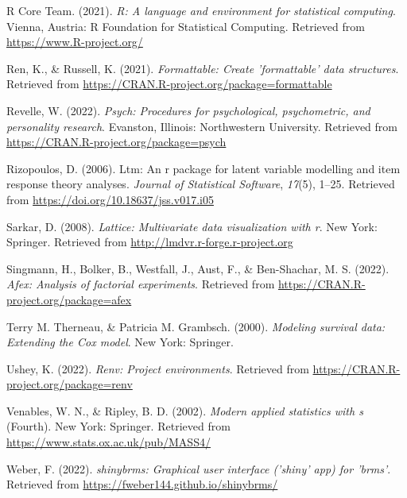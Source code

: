 \documentclass[
  english,
  man]{apa6}
\newlength{\cslhangindent}
\newlength{\cslentryspacingunit} %
\newenvironment{CSLReferences}[2] %
 {%
  \setlength{\parindent}{0pt}
  \ifodd #1
  \let\oldpar\par
  \def\par{\hangindent=\cslhangindent\oldpar}
  \fi
  \setlength{\parskip}{#2\cslentryspacingunit}
 }%
 {}
\begin{document}
\begin{CSLReferences}{1}{0}
\leavevmode{}%
R Core Team. (2021). \emph{R: A language and environment for statistical computing}. Vienna, Austria: R Foundation for Statistical Computing. Retrieved from \url{https://www.R-project.org/}

\leavevmode{}%
Ren, K., \& Russell, K. (2021). \emph{Formattable: Create 'formattable' data structures}. Retrieved from \url{https://CRAN.R-project.org/package=formattable}

\leavevmode{}%
Revelle, W. (2022). \emph{Psych: Procedures for psychological, psychometric, and personality research}. Evanston, Illinois: Northwestern University. Retrieved from \url{https://CRAN.R-project.org/package=psych}

\leavevmode{}%
Rizopoulos, D. (2006). Ltm: An r package for latent variable modelling and item response theory analyses. \emph{Journal of Statistical Software}, \emph{17}(5), 1--25. Retrieved from \url{https://doi.org/10.18637/jss.v017.i05}

\leavevmode{}%
Sarkar, D. (2008). \emph{Lattice: Multivariate data visualization with r}. New York: Springer. Retrieved from \url{http://lmdvr.r-forge.r-project.org}

\leavevmode{}%
Singmann, H., Bolker, B., Westfall, J., Aust, F., \& Ben-Shachar, M. S. (2022). \emph{Afex: Analysis of factorial experiments}. Retrieved from \url{https://CRAN.R-project.org/package=afex}

\leavevmode{}%
Terry M. Therneau, \& Patricia M. Grambsch. (2000). \emph{Modeling survival data: Extending the {C}ox model}. New York: Springer.

\leavevmode{}%
Ushey, K. (2022). \emph{Renv: Project environments}. Retrieved from \url{https://CRAN.R-project.org/package=renv}

\leavevmode{}%
Venables, W. N., \& Ripley, B. D. (2002). \emph{Modern applied statistics with s} (Fourth). New York: Springer. Retrieved from \url{https://www.stats.ox.ac.uk/pub/MASS4/}

\leavevmode{}%
Weber, F. (2022). \emph{{shinybrms}: Graphical user interface ('{shiny}' app) for '{brms}'}. Retrieved from \url{https://fweber144.github.io/shinybrms/}


\end{CSLReferences}
\end{document}
